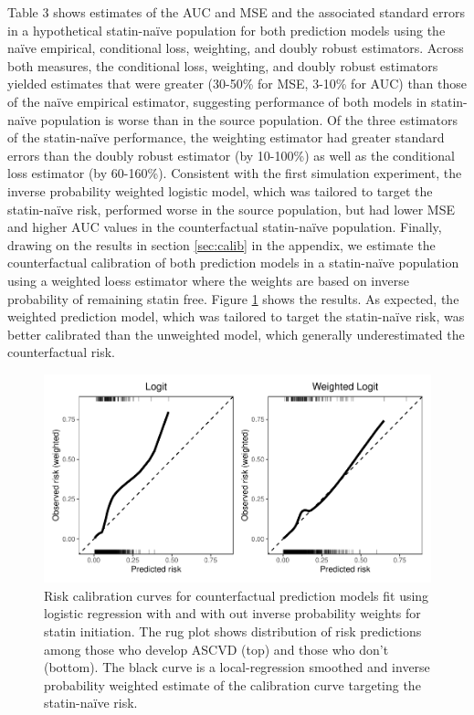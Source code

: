Table 3 shows estimates of the AUC and MSE and the associated standard errors in a hypothetical statin-na\"{i}ve population for both prediction models using the na\"{i}ve empirical, conditional loss, weighting, and doubly robust estimators. Across both measures, the conditional loss, weighting, and doubly robust estimators yielded estimates that were greater (30-50\% for MSE, 3-10\% for AUC) than those of the na\"{i}ve empirical estimator, suggesting performance of both models in statin-na\"{i}ve population is worse than in the source population. Of the three estimators of the statin-na\"{i}ve performance, the weighting estimator had greater standard errors than the doubly robust estimator (by 10-100\%) as well as the conditional loss estimator (by 60-160\%). Consistent with the first simulation experiment, the inverse probability weighted logistic model, which was tailored to target the statin-na\"{i}ve risk, performed worse in the source population, but had lower MSE and higher AUC values in the counterfactual statin-na\"{i}ve population. Finally, drawing on the results in section \ref{sec:calib} in the appendix, we estimate the counterfactual calibration of both prediction models in a statin-na\"{i}ve population using a weighted loess estimator where the weights are based on inverse probability of remaining statin free. Figure \ref{fig:calib} shows the results. As expected, the weighted prediction model, which was tailored to target the statin-na\"{i}ve risk, was better calibrated than the unweighted model, which generally underestimated the counterfactual risk.

\begin{figure}[p]
    \centering
    \includegraphics{../3_figures/calib.pdf}
    \caption{Risk calibration curves for counterfactual prediction models fit using logistic regression with and with out inverse probability weights for statin initiation. The rug plot shows distribution of risk predictions among those who develop ASCVD (top) and those who don't (bottom). The black curve is a local-regression smoothed and inverse probability weighted estimate of the calibration curve targeting the statin-na\"{i}ve risk.\label{fig:calib}}
\end{figure}





